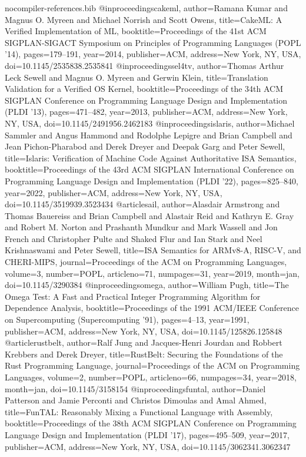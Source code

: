 \begin{filecontents*}[overwrite]{nocompiler-references.bib}
@inproceedings{cakeml, author={Ramana Kumar and Magnus O. Myreen and Michael Norrish and Scott Owens}, title={{CakeML}: A Verified Implementation of {ML}}, booktitle={Proceedings of the 41st ACM SIGPLAN-SIGACT Symposium on Principles of Programming Languages (POPL '14)}, pages={179--191}, year={2014}, publisher={ACM}, address={New York, NY, USA}, doi={10.1145/2535838.2535841}}
@inproceedings{sel4tv, author={Thomas Arthur Leck Sewell and Magnus O. Myreen and Gerwin Klein}, title={Translation Validation for a Verified {OS} Kernel}, booktitle={Proceedings of the 34th ACM SIGPLAN Conference on Programming Language Design and Implementation (PLDI '13)}, pages={471--482}, year={2013}, publisher={ACM}, address={New York, NY, USA}, doi={10.1145/2491956.2462183}}
@inproceedings{islaris, author={Michael Sammler and Angus Hammond and Rodolphe Lepigre and Brian Campbell and Jean Pichon-Pharabod and Derek Dreyer and Deepak Garg and Peter Sewell}, title={Islaris: Verification of Machine Code Against Authoritative {ISA} Semantics}, booktitle={Proceedings of the 43rd ACM SIGPLAN International Conference on Programming Language Design and Implementation (PLDI '22)}, pages={825--840}, year={2022}, publisher={ACM}, address={New York, NY, USA}, doi={10.1145/3519939.3523434}}
@article{sail, author={Alasdair Armstrong and Thomas Bauereiss and Brian Campbell and Alastair Reid and Kathryn E. Gray and Robert M. Norton and Prashanth Mundkur and Mark Wassell and Jon French and Christopher Pulte and Shaked Flur and Ian Stark and Neel Krishnaswami and Peter Sewell}, title={{ISA} Semantics for {ARMv8-A}, {RISC-V}, and {CHERI-MIPS}}, journal={Proceedings of the ACM on Programming Languages}, volume={3}, number={POPL}, articleno={71}, numpages={31}, year={2019}, month=jan, doi={10.1145/3290384}}
@inproceedings{omega, author={William Pugh}, title={The {Omega} Test: A Fast and Practical Integer Programming Algorithm for Dependence Analysis}, booktitle={Proceedings of the 1991 ACM/IEEE Conference on Supercomputing (Supercomputing '91)}, pages={4--13}, year={1991}, publisher={ACM}, address={New York, NY, USA}, doi={10.1145/125826.125848}}
@article{rustbelt, author={Ralf Jung and Jacques-Henri Jourdan and Robbert Krebbers and Derek Dreyer}, title={{RustBelt}: Securing the Foundations of the {Rust} Programming Language}, journal={Proceedings of the ACM on Programming Languages}, volume={2}, number={POPL}, articleno={66}, numpages={34}, year={2018}, month=jan, doi={10.1145/3158154}}
@inproceedings{funtal, author={Daniel Patterson and Jamie Perconti and Christos Dimoulas and Amal Ahmed}, title={{FunTAL}: Reasonably Mixing a Functional Language with Assembly}, booktitle={Proceedings of the 38th ACM SIGPLAN Conference on Programming Language Design and Implementation (PLDI '17)}, pages={495--509}, year={2017}, publisher={ACM}, address={New York, NY, USA}, doi={10.1145/3062341.3062347}}

\end{filecontents*}

